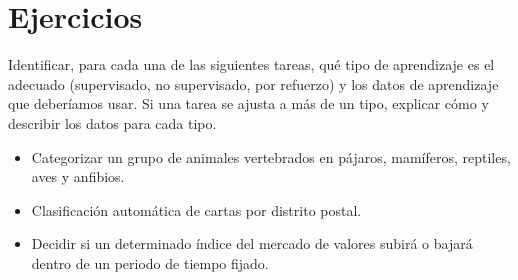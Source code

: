 \documentclass[a4paper, 11pt]{article}
\begin{document}
    \maketitle

    \section{Ejercicios}

    \begin{ejercicio}
        Identificar, para cada una de las siguientes tareas, qué tipo de aprendizaje es el adecuado (supervisado, no supervisado, por refuerzo) y los datos de aprendizaje que deberíamos usar. Si una tarea se ajusta a más de un tipo, explicar cómo y describir los datos para cada tipo.
        \begin{itemize}
            \item Categorizar un grupo de animales vertebrados en pájaros, mamíferos, reptiles, aves y anfibios.
            \item Clasificación automática de cartas por distrito postal.
            \item Decidir si un determinado índice del mercado de valores subirá o bajará dentro de un periodo de tiempo fijado.
        \end{itemize}
    \end{ejercicio}
\end{document}
